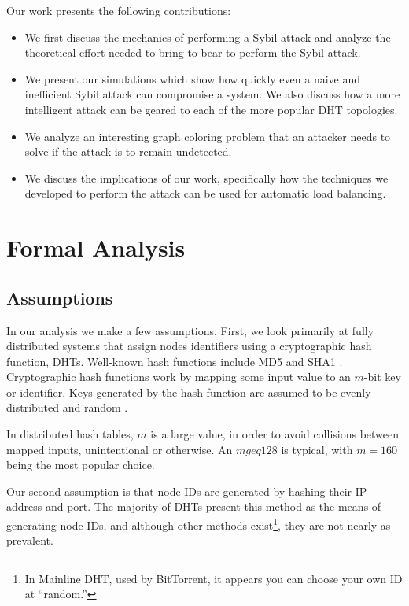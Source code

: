 \documentclass[10pt,a4paper]{article}
\begin{document}
Our work presents the following contributions:
\begin{itemize}
    \item We first discuss the mechanics of performing a Sybil attack and analyze the theoretical effort needed to bring to bear to perform the Sybil attack.
    \item We present our simulations which show how quickly even a naive and inefficient Sybil attack can compromise a system.  We also discuss how a more intelligent attack can be geared to each of the more popular DHT topologies.
    \item We analyze an interesting graph coloring problem that an attacker needs to solve if the attack is to remain undetected.
    \item We discuss the implications of our work, specifically how the techniques we developed to perform the attack can be used for automatic load balancing.

\end{itemize}

\section{Formal Analysis}


\subsection{Assumptions}
In our analysis we make a few assumptions. 
First, we look primarily at fully distributed systems that assign nodes identifiers using a cryptographic hash function, DHTs.
Well-known hash functions include MD5 \cite{md5} and SHA1 \cite{sha1}.
Cryptographic hash functions work by mapping some input value to an $m$-bit key or identifier.
Keys generated by the hash function are assumed to be evenly distributed and random \cite{bellare2004hash}. 

In distributed hash tables, $m$ is a large value, in order to avoid collisions between mapped inputs, unintentional or otherwise. 
An $m geq 128$ is typical, with $m = 160$ being the most popular choice.


Our second assumption is that node IDs are generated by hashing their IP address and port.
The majority of DHTs present this method as the means of generating node IDs, and although other methods exist\footnote{In Mainline DHT, used by BitTorrent, it appears you can choose your own ID at ``random.''}, they are not nearly as prevalent.
\end{document}
